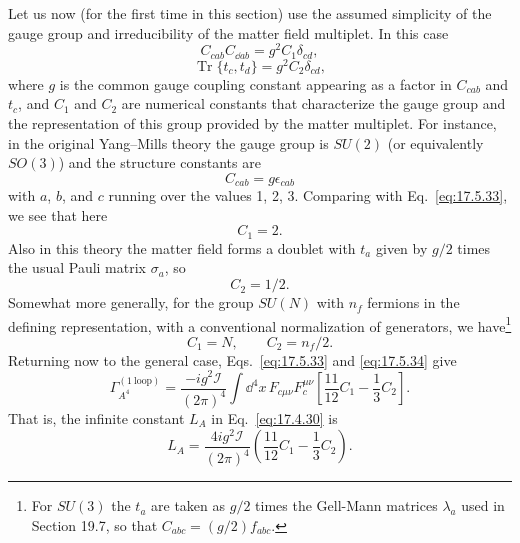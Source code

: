 Let us now (for the first time in this section) use the assumed simplicity
of the gauge group and irreducibility of the matter field multiplet. In this
case
\begin{equation}
C_{cab}C_{\dd ab}=g^2C_1\delta_{cd},
\label{eq:17.5.33}
\end{equation}
\begin{equation}
\operatorname{Tr}\{t_c,t_d\}=g^2C_2\delta_{cd},
\label{eq:17.5.34}
\end{equation}
where $g$ is the common gauge coupling constant appearing as a factor in
$C_{cab}$ and $t_c$, and $C_1$ and $C_2$ are numerical
constants that characterize the gauge group and the representation of this
group provided by the matter multiplet. For instance, in the original
Yang--Mills theory the gauge group is $SU(2)$ (or equivalently $SO(3)$) and
the structure constants are
\[
C_{cab}=g\epsilon_{cab}
\]
with $a$, $b$, and $c$ running over the values 1, 2, 3.
Comparing with Eq.~\eqref{eq:17.5.33}, we see that here
\[
C_1=2.
\]
Also in this theory the matter field forms a doublet with $t_a$ given by
$g/2$ times the usual Pauli matrix $\sigma_a$, so
\[
C_2=1/2.
\]
Somewhat more generally, for the group $SU(N)$ with $n_f$ fermions in the
defining representation, with a conventional normalization of generators,
we have\footnote{For $SU(3)$ the $t_a$ are taken as $g/2$ times the
Gell-Mann matrices $\lambda_a$ used in Section 19.7, so that
$C_{abc}=(g/2)f_{abc}$.}
\begin{equation}
C_1=N,\qquad C_2=n_f/2.
\label{eq:17.5.35}
\end{equation}
Returning now to the general case, Eqs.~\eqref{eq:17.5.33} and
\eqref{eq:17.5.34} give
\begin{equation}
\Gamma_{A^4}^{(1\ \mathrm{loop})}
=\frac{-ig^2\mathcal I}{(2\pi)^4}\int \dd^4x\,F_{c\mu\nu}F_c^{\mu\nu}
\left[\frac{11}{12}C_1-\frac13C_2\right].
\label{eq:17.5.36}
\end{equation}
That is, the infinite constant $L_A$ in Eq.~\eqref{eq:17.4.30} is
\begin{equation}
L_A=\frac{4ig^2\mathcal I}{(2\pi)^4}
\left(\frac{11}{12}C_1-\frac13C_2\right).
\label{eq:17.5.37}
\end{equation}

